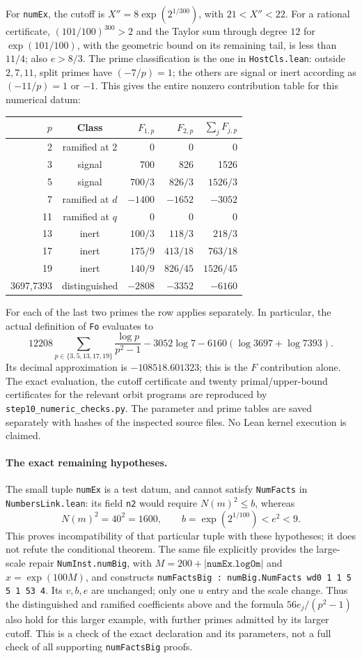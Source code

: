 \documentclass[11pt,a4paper]{article}
\theoremstyle{remark}
\begin{document}
For \texttt{numEx}, the cutoff is
$X''=8\exp(2^{1/300})$, with $21<X''<22$.
For a rational certificate, $(101/100)^{300}>2$ and the Taylor sum
through degree $12$ for $\exp(101/100)$, with the geometric bound on its
remaining tail, is less than $11/4$; also $e>8/3$.
The prime classification is the one in \texttt{HostCls.lean}:
outside $2,7,11$, split primes have $(-7/p)=1$; the others are signal
or inert according as $(-11/p)=1$ or $-1$.
This gives the entire nonzero contribution table for this numerical datum:
\begin{center}
\begin{tabular}{rcrrr}
\toprule
$p$&Class&$F_{1,p}$&$F_{2,p}$&$\sum_jF_{j,p}$\\
\midrule
2&ramified at $2$&0&0&0\\
3&signal&700&826&1526\\
5&signal&$700/3$&$826/3$&$1526/3$\\
7&ramified at $d$&$-1400$&$-1652$&$-3052$\\
11&ramified at $q$&0&0&0\\
13&inert&$100/3$&$118/3$&$218/3$\\
17&inert&$175/9$&$413/18$&$763/18$\\
19&inert&$140/9$&$826/45$&$1526/45$\\
3697,7393&distinguished&$-2808$&$-3352$&$-6160$\\
\bottomrule
\end{tabular}
\end{center}
For each of the last two primes the row applies separately.  In particular,
the actual definition of \texttt{Fo} evaluates to
\[
 12208\sum_{p\in\{3,5,13,17,19\}}\frac{\log p}{p^2-1}
 -3052\log7-6160(\log3697+\log7393).
\]
Its decimal approximation is $-108518.601323$; this is the $F$
contribution alone.  The exact evaluation, the cutoff certificate and
twenty primal/upper-bound certificates for the relevant orbit programs
are reproduced by \texttt{step10\_numeric\_checks.py}.  The parameter
and prime tables are saved separately with hashes of the inspected source
files.  No Lean kernel execution is claimed.

\paragraph{The exact remaining hypotheses.}
The small tuple \texttt{numEx} is a test datum, and cannot satisfy
\texttt{NumFacts} in \texttt{NumbersLink.lean}: its field \texttt{n2}
would require $N(m)^2\le b$, whereas
\[
 N(m)^2=40^2=1600,\qquad b=\exp(2^{1/100})<e^2<9.
\]
This proves incompatibility of that particular tuple with these hypotheses;
it does not refute the conditional theorem.  The same file explicitly
provides the large-scale repair \texttt{NumInst.numBig}, with
$M=200+|\texttt{numEx.logOm}|$ and $x=\exp(100M)$, and constructs
\texttt{numFactsBig : numBig.NumFacts wd0 1 1 5 5 1 53 4}.
Its $v,b,e$ are unchanged; only one $u$ entry and the scale change.
Thus the distinguished and ramified coefficients above and the formula
$56e_j/(p^2-1)$ also hold for this larger example, with further primes
admitted by its larger cutoff.  This is a check of the exact declaration
and its parameters, not a full check of all supporting \texttt{numFactsBig}
proofs.
\end{document}
